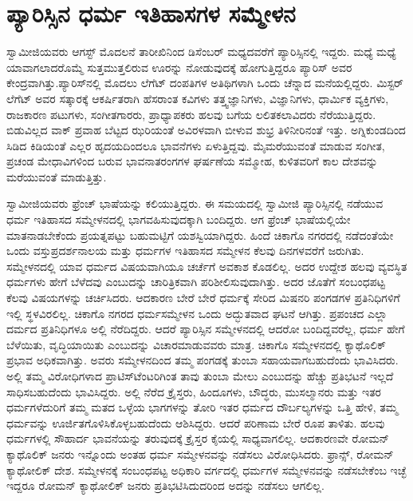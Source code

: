 
\chapter{ಪ್ಯಾರಿಸ್ಸಿನ ಧರ್ಮ ಇತಿಹಾಸಗಳ ಸಮ್ಮೇಳನ }

 ಸ್ವಾಮೀಜಿಯವರು ಆಗಸ್ಟ್ ಮೊದಲನೆ ತಾರೀಖಿನಿಂದ ಡಿಸೆಂಬರ್ ಮಧ್ಯದವರೆಗೆ ಪ್ಯಾರಿಸ್ಸಿನಲ್ಲಿ ಇದ್ದರು. ಮಧ್ಯೆ ಮಧ್ಯೆ ಯಾವಾಗಲಾದರೊಮ್ಮೆ ಸುತ್ತಮುತ್ತಲಿರುವ ಊರನ್ನು ನೋಡುವುದಕ್ಕೆ ಹೋಗುತ್ತಿದ್ದರೂ ಪ್ಯಾರಿಸ್ ಅವರ ಕೇಂದ್ರವಾಗಿತ್ತು.\break ಪ್ಯಾರಿಸ್‍ನಲ್ಲಿ ಮೊದಲು ಲೆಗೆಟ್ ದಂಪತಿಗಳ ಅತಿಥಿಗಳಾಗಿ ಒಂದು ಚೆನ್ನಾದ ಮನೆಯಲ್ಲಿದ್ದರು. ಮಿಸ್ಟರ್ ಲೆಗೆಟ್ ಅವರ ಸತ್ಕಾರಕ್ಕೆ ಆಕರ್ಷಿತರಾಗಿ ಹೆಸರಾಂತ ಕವಿಗಳು ತತ್ತ್ವಜ್ಞಾನಿಗಳು, ವಿಜ್ಞಾನಿಗಳು, ಧಾರ್ಮಿಕ ವ್ಯಕ್ತಿಗಳು, ರಾಜಕಾರಣ ಪಟುಗಳು, ಸಂಗೀತಗಾರರು, ಪ್ರಾಧ್ಯಾಪಕರು ಹಲವು ಬಗೆಯ ಲಲಿತಕಲಾವಿದರು ನೆರೆಯುತ್ತಿದ್ದರು. ಬಿಡುವಿಲ್ಲದ ವಾಕ್ ಪ್ರವಾಹ ಬೆಟ್ಟದ ಝರಿಯಂತೆ ಅವಿರಳವಾಗಿ ಬೀಳುವ ಶುಭ್ರ ತಿಳಿನೀರಿನಂತೆ ಇತ್ತು. ಅಗ್ನಿಕುಂಡದಿಂದ ಸಿಡಿದ ಕಿಡಿಯಂತೆ ಎಲ್ಲರ ಹೃದಯದಿಂದಲೂ ಭಾವನೆಗಳು ಏಳುತ್ತಿದ್ದವು. ಮೈಮರೆಯುವಂತೆ ಮಾಡುವ ಸಂಗೀತ, ಪ್ರಚಂಡ ಮೇಧಾವಿಗಳಿಂದ ಬರುವ ಭಾವನಾತರಂಗಗಳ ಘರ್ಷಣೆಯ ಸಮ್ಮೋಹ, ಕುಳಿತವರಿಗೆ ಕಾಲ ದೇಶವನ್ನು ಮರೆಯುವಂತೆ ಮಾಡುತ್ತಿತ್ತು. 

 ಸ್ವಾಮೀಜಿಯವರು ಫ್ರೆಂಚ್ ಭಾಷೆಯನ್ನು ಕಲಿಯುತ್ತಿದ್ದರು. ಈ ಸಮಯದಲ್ಲಿ ಸ್ವಾಮೀಜಿ ಪ್ಯಾರಿಸ್ಸಿನಲ್ಲಿ ನಡೆಯುವ ಧರ್ಮ ಇತಿಹಾಸದ ಸಮ್ಮೇಳನದಲ್ಲಿ ಭಾಗವಹಿಸುವುದಕ್ಕಾಗಿ ಬಂದಿದ್ದರು. ಆಗ ಫ್ರೆಂಚ್ ಭಾಷೆಯಲ್ಲಿಯೇ ಮಾತನಾಡಬೇಕೆಂದು ಪ್ರಯತ್ನಪಟ್ಟು ಬಹುಮಟ್ಟಿಗೆ ಯಶಸ್ವಿಯಾಗಿದ್ದರು. ಹಿಂದೆ ಚಿಕಾಗೊ ನಗರದಲ್ಲಿ ನಡೆದಂತೆಯೇ ಒಂದು ವಸ್ತುಪ್ರದರ್ಶನಾಲಯ ಮತ್ತು ಧರ್ಮಗಳ ಇತಿಹಾಸದ ಸಮ್ಮೇಳನ ಕೆಲವು ದಿನಗಳವರೆಗೆ ಜರುಗಿತು. ಸಮ್ಮೇಳನದಲ್ಲಿ ಯಾವ ಧರ್ಮದ ವಿಷಯವಾಗಿಯೂ ಚರ್ಚೆಗೆ ಅವಕಾಶ ಕೊಡಲಿಲ್ಲ. ಅದರ ಉದ್ದೇಶ ಹಲವು ವ್ಯವಸ್ಥಿತ ಧರ್ಮಗಳು ಹೇಗೆ ಬೆಳೆದವು ಎಂಬುದನ್ನು ಚಾರಿತ್ರಿಕವಾಗಿ ಪರಿಶೀಲಿಸುವುದಾಗಿತ್ತು. ಅದರ ಜೊತೆಗೆ ಸಂಬಂಧಪಟ್ಟ ಕೆಲವು ವಿಷಯಗಳನ್ನು ಚರ್ಚಿಸಿದರು. ಆದಕಾರಣ ಬೇರೆ ಬೇರೆ ಧರ್ಮಕ್ಕೆ ಸೇರಿದ ಮಿಷನರಿ ಪಂಗಡಗಳ ಪ್ರತಿನಿಧಿಗಳಿಗೆ ಇಲ್ಲಿ ಸ್ಥಳವಿರಲಿಲ್ಲ. ಚಿಕಾಗೊ ನಗರದ ಧರ್ಮಸಮ್ಮೇಳನ ಒಂದು ಅದ್ಭುತವಾದ ಘಟನೆ ಆಗಿತ್ತು. ಪ್ರಪಂಚದ ಎಲ್ಲಾ ದರ್ಮದ ಪ್ರತಿನಿಧಿಗಳೂ ಅಲ್ಲಿ ನೆರೆದಿದ್ದರು. ಆದರೆ ಪ್ಯಾರಿಸ್ಸಿನ ಸಮ್ಮೇಳನದಲ್ಲಿ ಆದರೋ ಬಂದಿದ್ದವರೆಲ್ಲ, ಧರ್ಮ ಹೇಗೆ ಬೆಳೆಯಿತು, ವೃದ್ಧಿಯಾಯಿತು ಎಂಬುದನ್ನು ವಿಚಾರಮಾಡುವವರು ಮಾತ್ರ. ಚಿಕಾಗೊ ಸಮ್ಮೇಳನದಲ್ಲಿ ಕ್ಯಾಥೊಲಿಕ್ ಪ್ರಭಾವ ಅಧಿಕವಾಗಿತ್ತು. ಅವರು ಸಮ್ಮೇಳನದಿಂದ ತಮ್ಮ ಪಂಗಡಕ್ಕೆ ತುಂಬಾ ಸಹಾಯವಾಗಬಹುದೆಂದು ಭಾವಿಸಿದರು. ಅಲ್ಲಿ ತಮ್ಮ ವಿರೋಧಿಗಳಾದ ಪ್ರಾಟಿಸ್‍ಟೆಂಟರಿಗಿಂತ ತಾವು ತುಂಬಾ ಮೇಲು ಎಂಬುದನ್ನು ಹೆಚ್ಚು ಪ್ರತಿಭಟನೆ ಇಲ್ಲದೆ ಸಾಧಿಸಬಹುದೆಂದು ಭಾವಿಸಿದ್ದರು. ಅಲ್ಲಿ ನೆರೆದ ಕ್ರೈಸ್ತರು, ಹಿಂದೂಗಳು, ಬೌದ್ಧರು, ಮುಸಲ್ಮಾನರು ಮತ್ತು ಇತರ ಧರ್ಮಗಳೆದುರಿಗೆ ತಮ್ಮ ಮತದ ಒಳ್ಳೆಯ ಭಾಗಗಳನ್ನು ತೋರಿ ಇತರ ಧರ್ಮದ ದೌರ್ಬಲ್ಯಗಳನ್ನು ಒತ್ತಿ ಹೇಳಿ, ತಮ್ಮ ಧರ್ಮವನ್ನು ಊರ್ಜಿತಗೊಳಿಸಿಕೊಳ್ಳಬಹುದೆಂದು ಆಶಿಸಿದ್ದರು. ಆದರೆ ಪರಿಣಾಮ ಬೇರೆ ರೂಪ ತಾಳಿತು. ಹಲವು ಧರ್ಮಗಳಲ್ಲಿ ಸೌಹಾರ್ದ ಭಾವನೆಯನ್ನು ತರುವುದಕ್ಕೆ ಕ್ರೈಸ್ತರ ಕೈಯಲ್ಲಿ ಸಾಧ್ಯವಾಗಲಿಲ್ಲ. ಆದಕಾರಣವೇ ರೋಮನ್ ಕ್ಯಾಥೊಲಿಕ್ ಜನರು ಇನ್ನೊಂದು ಅಂತಹ ಧರ್ಮ ಸಮ್ಮೇಳನವನ್ನು ನಡೆಸಲು ವಿರೋಧಿಸಿದರು. ಫ್ರಾನ್ಸ್, ರೋಮನ್ ಕ್ಯಾಥೋಲಿಕ್ ದೇಶ. ಸಮ್ಮೇಳನಕ್ಕೆ ಸಂಬಂಧಪಟ್ಟ ಅಧಿಕಾರಿ ವರ್ಗದಲ್ಲಿ ಧರ್ಮಗಳ ಸಮ್ಮೇಳನವನ್ನು ನಡೆಸಬೇಕೆಂಬ ಇಚ್ಛೆ ಇದ್ದರೂ ರೋಮನ್ ಕ್ಯಾಥೋಲಿಕ್ ಜನರು ಪ್ರತಿಭಟಿಸಿದುದರಿಂದ ಅದನ್ನು ನಡೆಸಲು ಆಗಲಿಲ್ಲ. 

